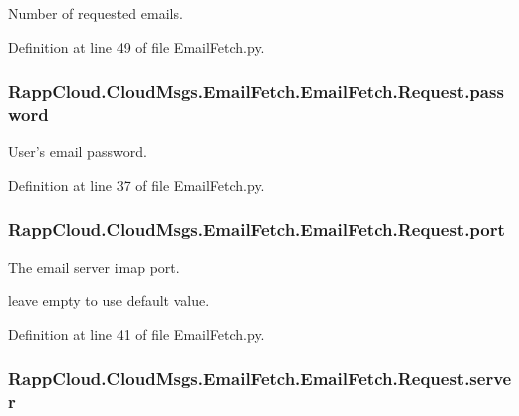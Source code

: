 Number of requested emails. 



Definition at line 49 of file Email\-Fetch.\-py.

\hypertarget{classRappCloud_1_1CloudMsgs_1_1EmailFetch_1_1EmailFetch_1_1Request_a08bce5b96f45195daadc488ebe126894}{
\subsubsection[{password}]{\setlength{\rightskip}{0pt plus 5cm}Rapp\-Cloud.\-Cloud\-Msgs.\-Email\-Fetch.\-Email\-Fetch.\-Request.\-password}}\label{classRappCloud_1_1CloudMsgs_1_1EmailFetch_1_1EmailFetch_1_1Request_a08bce5b96f45195daadc488ebe126894}


User's email password. 



Definition at line 37 of file Email\-Fetch.\-py.

\hypertarget{classRappCloud_1_1CloudMsgs_1_1EmailFetch_1_1EmailFetch_1_1Request_a02b001ea07a0f2887a916a74fcedb5a4}{
\subsubsection[{port}]{\setlength{\rightskip}{0pt plus 5cm}Rapp\-Cloud.\-Cloud\-Msgs.\-Email\-Fetch.\-Email\-Fetch.\-Request.\-port}}\label{classRappCloud_1_1CloudMsgs_1_1EmailFetch_1_1EmailFetch_1_1Request_a02b001ea07a0f2887a916a74fcedb5a4}


The email server imap port. 

leave empty to use default value. 

Definition at line 41 of file Email\-Fetch.\-py.

\hypertarget{classRappCloud_1_1CloudMsgs_1_1EmailFetch_1_1EmailFetch_1_1Request_a388ba1968b842e1d8b26000320e5f7bc}{
\subsubsection[{server}]{\setlength{\rightskip}{0pt plus 5cm}Rapp\-Cloud.\-Cloud\-Msgs.\-Email\-Fetch.\-Email\-Fetch.\-Request.\-server}}\label{classRappCloud_1_1CloudMsgs_1_1EmailFetch_1_1EmailFetch_1_1Request_a388ba1968b842e1d8b26000320e5f7bc}


